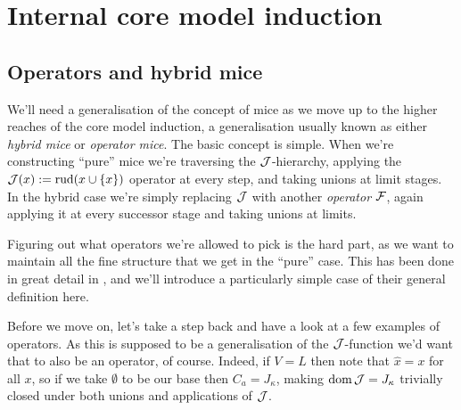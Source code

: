 \documentclass[../../main]{subfiles}
\begin{document}
\chapter{Internal core model induction}
\label{chapter.internal-core-model-induction}
\thispagestyle{fancy}


\section{Operators and hybrid mice}

We'll need a generalisation of the concept of mice as we move up to the higher reaches of the core model induction, a generalisation usually known as either \textit{hybrid mice} or \textit{operator mice}. The basic concept is simple. When we're constructing ``pure'' mice we're traversing the $\operatorname{\mathcal J}$-hierarchy, applying the $\operatorname{\mathcal J}(x):=\operatorname{rud}(x\cup\{x\})$ operator at every step, and taking unions at limit stages. In the hybrid case we're simply replacing $\operatorname{\mathcal J}$ with another \textit{operator} $\operatorname{\mathcal F}$, again applying it at every successor stage and taking unions at limits.

\qquad Figuring out what operators we're allowed to pick is the hard part, as we want to maintain all the fine structure that we get in the ``pure'' case. This has been done in great detail in \cite{SchlutzenbergTrang}, and we'll introduce a particularly simple case of their general definition here.



Before we move on, let's take a step back and have a look at a few examples of operators. As this is supposed to be a generalisation of the $\operatorname{\mathcal J}$-function we'd want that to also be an operator, of course. Indeed, if $V=L$ then note that $\hat x=x$ for all $x$, so if we take $\emptyset$ to be our base then $C_a=J_\kappa$, making $\operatorname{dom}\operatorname{\mathcal J}=J_\kappa$ trivially closed under both unions and applications of $\operatorname{\mathcal J}$.
\end{document}
